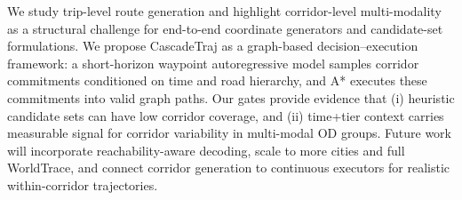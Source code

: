 We study trip-level route generation and highlight corridor-level multi-modality as a structural challenge for end-to-end coordinate generators and candidate-set formulations.
We propose CascadeTraj as a graph-based decision--execution framework: a short-horizon waypoint autoregressive model samples corridor commitments conditioned on time and road hierarchy, and A* executes these commitments into valid graph paths.
Our gates provide evidence that (i) heuristic candidate sets can have low corridor coverage, and (ii) time+tier context carries measurable signal for corridor variability in multi-modal OD groups.
Future work will incorporate reachability-aware decoding, scale to more cities and full WorldTrace, and connect corridor generation to continuous executors for realistic within-corridor trajectories.
